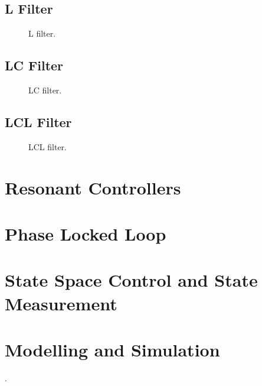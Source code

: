 \subsection{L Filter}
\begin{figure}[htbp]
\centerline{}
\caption{L filter.}
\label{lfil}
\end{figure}
%
\subsection{LC Filter}
\begin{figure}[htbp]
\centerline{}
\caption{LC filter.}
\label{lcfil}
\end{figure}
%
\subsection{LCL Filter}
\begin{figure}[htbp]
\centerline{}
\caption{LCL filter.}
\label{lclfil}
\end{figure}
%
\section{Resonant Controllers}
\section{Phase Locked Loop}
\section{State Space Control and State Measurement}
\section{Modelling and Simulation}.

